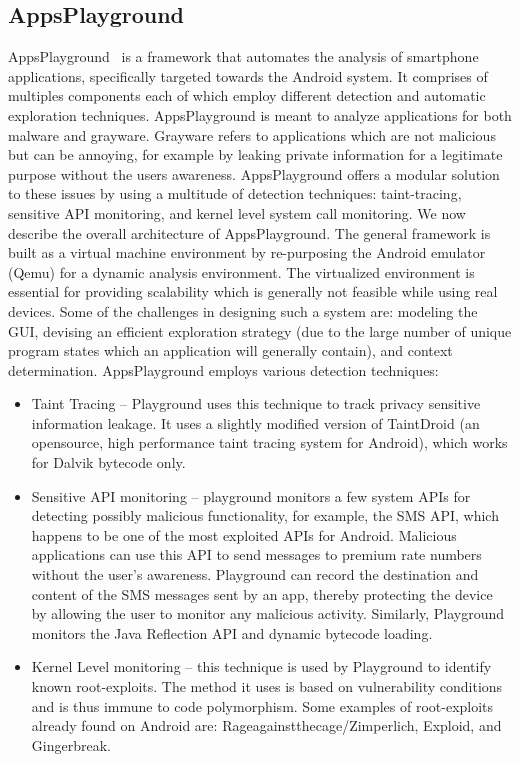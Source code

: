\documentclass[11pt]{article}
\begin{document}
	\subsection{AppsPlayground}
	AppsPlayground~\cite{rastogi2013appsplayground} is a framework that automates the analysis of smartphone applications, specifically targeted towards the Android system. It comprises of multiples components each of which employ different detection and automatic exploration techniques. AppsPlayground is meant to analyze applications for both malware and grayware. Grayware refers to applications which are not malicious but can be annoying, for example by leaking private information for a legitimate purpose without the users awareness. AppsPlayground offers a modular solution to these issues by using a multitude of detection techniques: taint-tracing, sensitive API monitoring, and kernel level system call monitoring.	
	We now describe the overall architecture of AppsPlayground. The general framework is built as a virtual machine environment by re-purposing the Android emulator (Qemu) for a dynamic analysis environment. The virtualized environment is essential for providing scalability which is generally not feasible while using real devices. Some of the challenges in designing such a system are: modeling the GUI, devising an efficient exploration strategy (due to the large number of unique program states which an application will generally contain), and context determination.
	AppsPlayground employs various detection techniques:
	\begin{itemize}
		\item Taint Tracing – Playground uses this technique to track privacy sensitive information leakage. It uses a slightly modified version of TaintDroid (an opensource, high performance taint tracing system for Android), which works for Dalvik bytecode only.
		\item Sensitive API monitoring – playground monitors a few system APIs for detecting possibly malicious functionality, for example, the SMS API, which happens to be one of the most exploited APIs for Android. Malicious applications can use this API to send messages to premium rate numbers without the user’s awareness. Playground can record the destination and content of the SMS messages sent by an app, thereby protecting the device by allowing the user to monitor any malicious activity. Similarly, Playground monitors the Java Reflection API and dynamic bytecode loading.
		\item Kernel Level monitoring – this technique is used by Playground to identify known root-exploits. The method it uses is based on vulnerability conditions and is thus immune to code polymorphism. Some examples of root-exploits already found on Android are: Rageagainstthecage/Zimperlich, Exploid, and Gingerbreak.
	\end{itemize}
\end{document}
